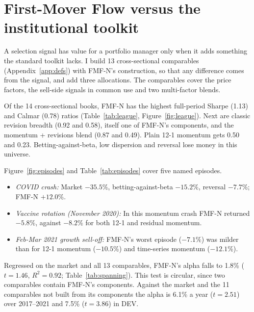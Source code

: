 \section{First-Mover Flow versus the institutional toolkit}\label{sec:toolkit}

A selection signal has value for a portfolio manager only when it adds something the standard toolkit lacks. I build 13 cross-sectional comparables (Appendix~\ref{app:defs}) with FMF-N's construction, so that any difference comes from the signal, and add three allocations. The comparables cover the price factors, the sell-side signals in common use and two multi-factor blends.

 Of the 14 cross-sectional books, FMF-N has the highest full-period Sharpe (1.13) and Calmar (0.78) ratios (Table~\ref{tab:league}, Figure~\ref{fig:league}). Next are classic revision breadth (0.92 and 0.58), itself one of FMF-N's components, and the momentum + revisions blend (0.87 and 0.49). Plain 12-1 momentum gets 0.50 and 0.23. Betting-against-beta, low dispersion and reversal lose money in this universe.

 Figure~\ref{fig:episodes} and Table~\ref{tab:episodes} cover five named episodes.
\begin{itemize}
  \item \emph{COVID crash:} Market $-35.5\%$, betting-against-beta $-15.2\%$, reversal $-7.7\%$; FMF-N $+12.0\%$.
  \item \emph{Vaccine rotation (November 2020):} In this momentum crash FMF-N returned $-5.8\%$, against $-8.2\%$ for both 12-1 and residual momentum.
  \item \emph{Feb-Mar 2021 growth sell-off:} FMF-N's worst episode ($-7.1\%$) was milder than for 12-1 momentum ($-10.5\%$) and time-series momentum ($-12.1\%$).
\end{itemize}

 Regressed on the market and all 13 comparables, FMF-N's alpha falls to 1.8\% ($t = 1.46$, $R^2 = 0.92$; Table~\ref{tab:spanning}). This test is circular, since two comparables contain FMF-N's components. Against the market and the 11 comparables not built from its components the alpha is 6.1\% a year ($t = 2.51$) over 2017--2021 and 7.5\% ($t = 3.86$) in DEV.

